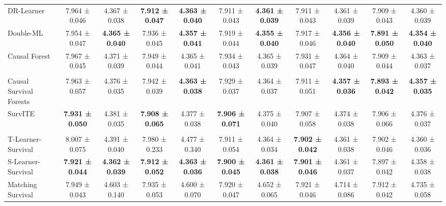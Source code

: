 \begin{table}[htbp]
{\begin{adjustbox}{angle=90,max height=0.95\textheight,center}
\begin{minipage}{\textheight}
\begin{adjustbox}{max width=\linewidth}
\begin{minipage}[c]{\linewidth}
\begin{adjustbox}{max width=\linewidth}
\begin{tabular}{l cc cc cc cc cc}
        DR-Learner & 7.964 ± 0.046 & 4.367 ± 0.038 & \textbf{7.912 ± 0.047} & \textbf{4.363 ± 0.040} & 7.911 ± 0.043 & \textbf{4.361 ± 0.039} & 7.911 ± 0.043 & 4.361 ± 0.039 & 7.909 ± 0.043 & 4.360 ± 0.039 \\
        Double-ML & 7.954 ± 0.047 & \textbf{4.365 ± 0.040} & 7.936 ± 0.045 & \textbf{4.357 ± 0.041} & 7.919 ± 0.044 & \textbf{4.355 ± 0.040} & 7.917 ± 0.046 & \textbf{4.356 ± 0.040} & \textbf{7.891 ± 0.050} & \textbf{4.354 ± 0.040} \\
        Causal Forest & 7.967 ± 0.045 & 4.371 ± 0.039 & 7.949 ± 0.044 & 4.365 ± 0.041 & 7.934 ± 0.043 & 4.365 ± 0.039 & 7.931 ± 0.047 & 4.364 ± 0.040 & 7.909 ± 0.044 & 4.363 ± 0.037 \\ 
        \addlinespace
        \multicolumn{9}{l}{\textit{Direct-Survival CATE Methods}} \\
        Causal Survival Forests & 7.963 ± 0.057 & 4.376 ± 0.035 & 7.942 ± 0.039 & \textbf{4.363 ± 0.038} & 7.929 ± 0.037 & 4.364 ± 0.037 & 7.911 ± 0.051 & \textbf{4.357 ± 0.036} & \textbf{7.893 ± 0.042} & \textbf{4.357 ± 0.035} \\
        SurvITE & \textbf{7.931 ± 0.050} & 4.381 ± 0.035 & \textbf{7.908 ± 0.065} & 4.377 ± 0.038 & \textbf{7.906 ± 0.071} & 4.375 ± 0.040 & 7.907 ± 0.058 & 4.374 ± 0.038 & 7.906 ± 0.066 & 4.376 ± 0.037 \\

        \addlinespace
        \multicolumn{9}{l}{\textit{Survival Meta-Learners}} \\ 
        T-Learner-Survival & 8.007 ± 0.075 & 4.391 ± 0.040 & 7.980 ± 0.233 & 4.477 ± 0.340 & 7.911 ± 0.054 & 4.364 ± 0.034 & \textbf{7.902 ± 0.042} & 4.361 ± 0.038 & 7.902 ± 0.046 & 4.360 ± 0.036 \\
        S-Learner-Survival & \textbf{7.921 ± 0.044} & \textbf{4.362 ± 0.039} & \textbf{7.912 ± 0.052} & \textbf{4.363 ± 0.036} & \textbf{7.900 ± 0.045} & \textbf{4.361 ± 0.038} & \textbf{7.901 ± 0.046} & 4.361 ± 0.037 & 7.897 ± 0.042 & 4.358 ± 0.038 \\
        Matching Survival & 7.949 ± 0.043 & 4.603 ± 0.140 & 7.935 ± 0.053 & 4.600 ± 0.070 & 7.920 ± 0.047 & 4.652 ± 0.065 & 7.921 ± 0.046 & 4.714 ± 0.086 & 7.912 ± 0.042 & 4.735 ± 0.058 \\ 
        \bottomrule
    \end{tabular}\end{adjustbox}
    \end{minipage}\end{adjustbox}\par


\end{minipage}
\end{adjustbox}}
\end{table}
